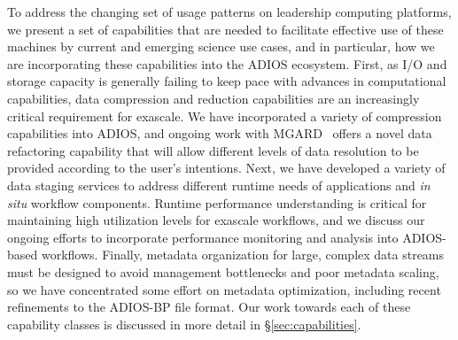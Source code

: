 To address the changing set of usage patterns on leadership computing platforms, we present a set of capabilities that are needed to facilitate effective use of these machines by current and emerging science use cases, and in particular, how we are incorporating these capabilities into the ADIOS ecosystem. First, as I/O and storage capacity is generally failing to keep pace with advances in computational capabilities, data compression and reduction capabilities are an increasingly critical requirement for exascale. We have incorporated a variety of compression capabilities into ADIOS, and ongoing work with MGARD~\cite{ainsworth2018multilevel} offers a novel data refactoring capability that will allow different levels of data resolution to be provided according to the user's intentions. Next, we have developed a variety of data staging services to address different runtime needs of applications and \textit{in situ} workflow components. Runtime performance understanding is critical for maintaining high utilization levels for exascale workflows, and we discuss our ongoing efforts to incorporate performance monitoring and analysis into ADIOS-based workflows. Finally, metadata organization for large, complex data streams must be designed to avoid management bottlenecks and poor metadata scaling, so we have concentrated some effort on metadata optimization, including recent refinements to the ADIOS-BP file format.
Our work towards each of these capability classes is discussed in more detail in \S\ref{sec:capabilities}.









